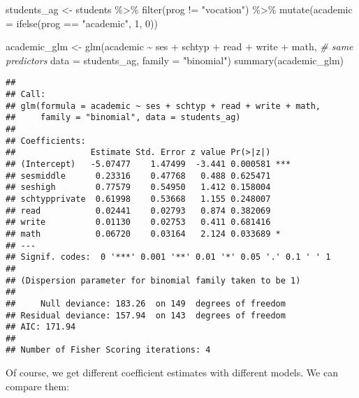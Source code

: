 \documentclass[
  oneside]{book}
\newenvironment{Shaded}{\begin{snugshade}}{\end{snugshade}}
\newcommand{\AttributeTok}[1]{\textcolor[rgb]{0.77,0.63,0.00}{#1}}
\newcommand{\CommentTok}[1]{\textcolor[rgb]{0.56,0.35,0.01}{\textit{#1}}}
\newcommand{\DecValTok}[1]{\textcolor[rgb]{0.00,0.00,0.81}{#1}}
\newcommand{\FunctionTok}[1]{\textcolor[rgb]{0.00,0.00,0.00}{#1}}
\newcommand{\NormalTok}[1]{#1}
\newcommand{\OtherTok}[1]{\textcolor[rgb]{0.56,0.35,0.01}{#1}}
\newcommand{\SpecialCharTok}[1]{\textcolor[rgb]{0.00,0.00,0.00}{#1}}
\newcommand{\StringTok}[1]{\textcolor[rgb]{0.31,0.60,0.02}{#1}}
\begin{document}
\begin{Shaded}
\begin{Highlighting}[]
\NormalTok{students\_ag }\OtherTok{\textless{}{-}}\NormalTok{ students }\SpecialCharTok{\%\textgreater{}\%}
  \FunctionTok{filter}\NormalTok{(prog }\SpecialCharTok{!=} \StringTok{"vocation"}\NormalTok{) }\SpecialCharTok{\%\textgreater{}\%}
  \FunctionTok{mutate}\NormalTok{(}\AttributeTok{academic =} \FunctionTok{ifelse}\NormalTok{(prog }\SpecialCharTok{==} \StringTok{"academic"}\NormalTok{, }\DecValTok{1}\NormalTok{, }\DecValTok{0}\NormalTok{))}

\NormalTok{academic\_glm }\OtherTok{\textless{}{-}} \FunctionTok{glm}\NormalTok{(academic }\SpecialCharTok{\textasciitilde{}}\NormalTok{ ses }\SpecialCharTok{+}\NormalTok{ schtyp }\SpecialCharTok{+}\NormalTok{ read }\SpecialCharTok{+}\NormalTok{ write }\SpecialCharTok{+}\NormalTok{ math, }\CommentTok{\# same predictors}
      \AttributeTok{data =}\NormalTok{ students\_ag, }\AttributeTok{family =} \StringTok{"binomial"}\NormalTok{)}
\FunctionTok{summary}\NormalTok{(academic\_glm)}
\end{Highlighting}
\end{Shaded}

\begin{verbatim}
## 
## Call:
## glm(formula = academic ~ ses + schtyp + read + write + math, 
##     family = "binomial", data = students_ag)
## 
## Coefficients:
##               Estimate Std. Error z value Pr(>|z|)    
## (Intercept)   -5.07477    1.47499  -3.441 0.000581 ***
## sesmiddle      0.23316    0.47768   0.488 0.625471    
## seshigh        0.77579    0.54950   1.412 0.158004    
## schtypprivate  0.61998    0.53668   1.155 0.248007    
## read           0.02441    0.02793   0.874 0.382069    
## write          0.01130    0.02753   0.411 0.681416    
## math           0.06720    0.03164   2.124 0.033689 *  
## ---
## Signif. codes:  0 '***' 0.001 '**' 0.01 '*' 0.05 '.' 0.1 ' ' 1
## 
## (Dispersion parameter for binomial family taken to be 1)
## 
##     Null deviance: 183.26  on 149  degrees of freedom
## Residual deviance: 157.94  on 143  degrees of freedom
## AIC: 171.94
## 
## Number of Fisher Scoring iterations: 4
\end{verbatim}

Of course, we get different coefficient estimates with different models.
We can compare them:

\begin{Shaded}
\end{Shaded}
\end{document}
